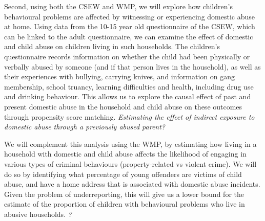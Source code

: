 \documentclass[11pt, a4paper]{article}
\begin{document}
Second, using both the CSEW and WMP, we will explore how children's behavioural problems are affected by witnessing or experiencing domestic abuse at home. Using data from the 10-15 year old questionnaire of the CSEW, which can be linked to the adult questionnaire, we can examine the effect of domestic and child abuse on children living in such households. The children's questionnaire records information on whether the child had been physically or verbally abused by someone (and if that person lives in the household), as well as their experiences with bullying, carrying knives, and information on gang membership, school truancy, learning difficulties and health, including drug use and drinking behaviour. This allows us to explore the causal effect of past and present domestic abuse in the household and child abuse on these outcomes through propensity score matching. \textit{Estimating the effect of indirect exposure to domestic abuse through a previously abused parent?}


We will complement this analysis using the WMP, by estimating how living in a household with domestic and child abuse affects the likelihood of engaging in various types of criminal behaviours (property-related vs violent crime). We will do so by identifying what percentage of young offenders are victims of child abuse, and have a home address that is associated with domestic abuse incidents. Given the problem of underreporting, this will give us a lower bound for the estimate of the proportion of children with behavioural problems who live in abusive households. \textit{?}
\end{document}
